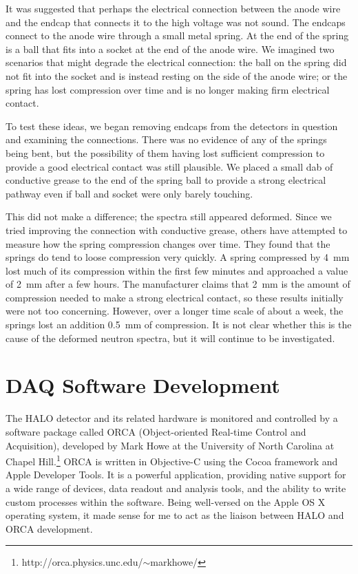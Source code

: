 		It was suggested that perhaps the electrical connection between the anode wire and the endcap that connects it to the high voltage was not sound. The endcaps connect to the anode wire through a small metal spring. At the end of the spring is a ball that fits into a socket at the end of the anode wire. We imagined two scenarios that might degrade the electrical connection: the ball on the spring did not fit into the socket and is instead resting on the side of the anode wire; or the spring has lost compression over time and is no longer making firm electrical contact.

		To test these ideas, we began removing endcaps from the detectors in question and examining the connections. There was no evidence of any of the springs being bent, but the possibility of them having lost sufficient compression to provide a good electrical contact was still plausible. We placed a small dab of conductive grease to the end of the spring ball to provide a strong electrical pathway even if ball and socket were only barely touching. 

		This did not make a difference; the spectra still appeared deformed. Since we tried improving the connection with conductive grease, others have attempted to measure how the spring compression changes over time. They found that the springs do tend to loose compression very quickly. A spring compressed by \SI{4}{\milli\metre} lost much of its compression within the first few minutes and approached a value of \SI{2}{\milli\metre} after a few hours. The manufacturer claims that \SI{2}{\milli\metre} is the amount of compression needed to make a strong electrical contact, so these results initially were not too concerning. However, over a longer time scale of about a week, the springs lost an addition \SI{0.5}{\milli\metre} of compression\cite{spring_test}. It is not clear whether this is the cause of the deformed neutron spectra, but it will continue to be investigated.

	\section{DAQ Software Development}
	\label{sec:orca_development}
		The HALO detector and its related hardware is monitored and controlled by a software package called ORCA (Object-oriented Real-time Control and Acquisition), developed by Mark Howe at the University of North Carolina at Chapel Hill.\footnote{http://orca.physics.unc.edu/$\sim$markhowe/} ORCA is written in Objective-C using the Cocoa framework and Apple Developer Tools. It is a powerful application, providing native support for a wide range of devices, data readout and analysis tools, and the ability to write custom processes within the software. Being well-versed on the Apple OS X operating system, it made sense for me to act as the liaison between HALO and ORCA development. 

